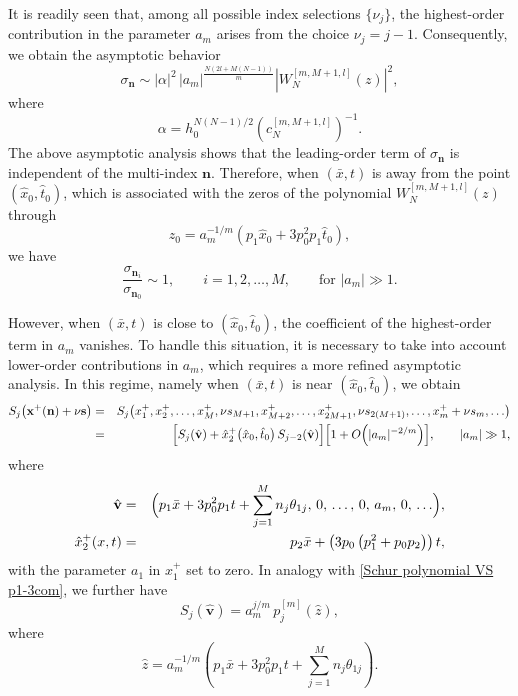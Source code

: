 \documentclass[preprint,3p,10pt]{elsarticle}
\theoremstyle{definition}
\begin{document}
It is readily seen that, among all possible index selections $\{\nu_j\}$, the highest-order contribution in the parameter $a_m$ arises from the choice $\nu_j=j-1$. Consequently, we obtain the asymptotic behavior
\begin{equation}
\sigma_{\mathbf{n}}
\sim
|\alpha|^2\,|a_m|^{\frac{N(2l+M(N-1))}{m}}
\left|W_{N}^{[m,M+1,l]}(z)\right|^2,
\end{equation}
where
\[
\alpha = h_0^{N(N-1)/2}\left(c_N^{[m,M+1,l]}\right)^{-1}.
\]
The above asymptotic analysis shows that the leading-order term of $\sigma_{\mathbf{n}}$ is independent of the multi-index $\mathbf{n}$. Therefore, when $(\bar{x},t)$ is away from the point $(\hat{x}_0,\hat{t}_0)$, which is associated with the zeros of the polynomial $W_{N}^{[m,M+1,l]}(z)$ through
\begin{equation}
    z_0 = a_m^{-1/m}\left(p_1 \hat{x}_0 + 3p_0^2p_1 \hat{t}_0\right),
\end{equation}
we have
\begin{equation}
   \frac{\sigma_{\mathbf{n}_i}}{\sigma_{\mathbf{n}_0}} \sim 1,
   \qquad i=1,2,\ldots,M,
   \qquad \text{for } |a_m|\gg 1.
\end{equation}

However, when $(\bar{x},t)$ is close to $(\hat{x}_0,\hat{t}_0)$, the coefficient of the highest-order term in $a_m$ vanishes. To handle this situation, it is necessary to take into account lower-order contributions in $a_m$, which requires a more refined asymptotic analysis. In this regime, namely when $(\bar{x},t)$ is near $(\hat{x}_0,\hat{t}_0)$, we obtain
\begin{eqnarray*}
S_j\!\left(\mathbf{x}^{+}(\mathbf{n})+\nu \mathbf{s}\right)
&=&S_j\!\left(x_1^{+}, x_2^{+}, \ldots, x_{M}^{+}, \nu s_{M+1},
x_{M+2}^{+}, \ldots, x_{2M+1}^{+}, \nu s_{2(M+1)}, \ldots, x_m^{+}+\nu s_m, \ldots \right)
\\
&=&\Bigl[S_j(\hat{\mathbf{v}})
+\hat{x}_2^{+}\!\left(\hat{x}_0,\hat{t}_0\right) S_{j-2}(\hat{\mathbf{v}})\Bigr]
\Bigl[1+O\!\left(|a_m|^{-2/m}\right)\Bigr],
\qquad |a_m|\gg 1,
\end{eqnarray*}
where
\begin{eqnarray*}
\hat{\mathbf{v}}
&=&\Bigl(p_1 \bar{x}+ 3p_0^2p_1 t+\sum_{j=1}^{M} n_j \theta_{1j},
\,0,\,\ldots,\,0,\,a_m,\,0,\,\ldots \Bigr),\\
\hat{x}_2^{+}(x,t)
&=&p_2 \bar{x}+\left(3p_0\left( p_1^2+p_0 p_2\right)\right)  t,
\end{eqnarray*}
with the parameter $a_1$ in $x_1^{+}$ set to zero. 
In analogy with \eqref{Schur polynomial VS p1-3com}, we further have
\begin{equation}
S_j(\hat{\mathbf{v}})=a_m^{j/m}\, p_j^{[m]}(\hat{z}),
\end{equation}
where
\begin{equation}
\hat{z}
=a_m^{-1/m}\!\left(p_1 \bar{x} + 3p_0^2p_1 t
+\sum_{j=1}^{M} n_j \theta_{1j}\right).
\end{equation}
\end{document}
